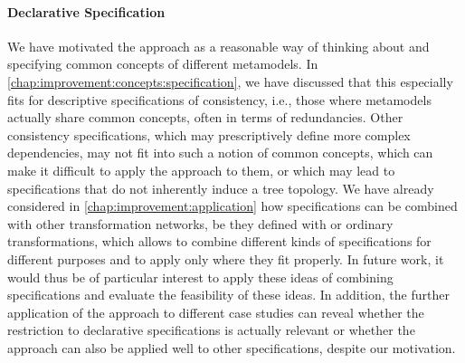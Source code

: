 \paragraph{Declarative Specification}
We have motivated the \commonalities approach as a reasonable way of thinking about and specifying common concepts of different metamodels.
In \autoref{chap:improvement:concepts:specification}, we have discussed that this especially fits for descriptive specifications of consistency, i.e., those where metamodels actually share common concepts, often in terms of redundancies.
Other consistency specifications, which may prescriptively define more complex dependencies, may not fit into such a notion of common concepts, which can make it difficult to apply the \commonalities approach to them, or which may lead to specifications that do not inherently induce a tree topology.
We have already considered in \autoref{chap:improvement:application} how \commonalities specifications can be combined with other transformation networks, be they defined with \commonalities or ordinary transformations, which allows to combine different kinds of specifications for different purposes and to apply \commonalities only where they fit properly.
In future work, it would thus be of particular interest to apply these ideas of combining specifications and evaluate the feasibility of these ideas.
In addition, the further application of the approach to different case studies can reveal whether the restriction to declarative specifications is actually relevant or whether the approach can also be applied well to other specifications, despite our motivation.

